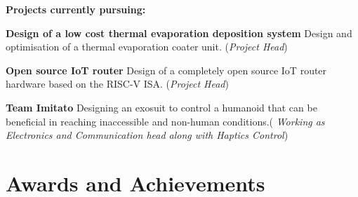 \documentclass[]{deedy-resume-openfont}
\begin{document}
\begin{minipage}[t]{0.66\textwidth}
\sectionsep
\quad \textbf{Projects currently pursuing:}
\begin{tightemize}
   \item \textbf{Design of a low cost thermal evaporation deposition system} \newline
    Design and optimisation of  a thermal evaporation coater unit. (\textit{Project Head})
    
      \item \textbf{Open source IoT router} \newline
    Design of a completely open source IoT router hardware based on the RISC-V ISA. (\textit{Project Head})
     
      \item \textbf{Team Imitato}\newline
    Designing  an exosuit to control a humanoid that can be beneficial in
reaching inaccessible and non-human conditions.( \textit {Working as Electronics and Communication head along with Haptics Control})


\end{tightemize}
\sectionsep








\section{Awards and Achievements} 



\end{minipage}
\end{document}
